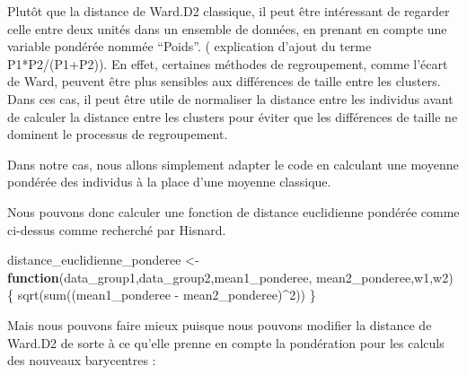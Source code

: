 \documentclass[
]{article}
\newenvironment{Shaded}{\begin{snugshade}}{\end{snugshade}}
\newcommand{\ControlFlowTok}[1]{\textcolor[rgb]{0.13,0.29,0.53}{\textbf{#1}}}
\newcommand{\DecValTok}[1]{\textcolor[rgb]{0.00,0.00,0.81}{#1}}
\newcommand{\FunctionTok}[1]{\textcolor[rgb]{0.00,0.00,0.00}{#1}}
\newcommand{\NormalTok}[1]{#1}
\newcommand{\OtherTok}[1]{\textcolor[rgb]{0.56,0.35,0.01}{#1}}
\newcommand{\SpecialCharTok}[1]{\textcolor[rgb]{0.00,0.00,0.00}{#1}}
\begin{document}
Plutôt que la distance de Ward.D2 classique, il peut être intéressant de
regarder celle entre deux unités dans un ensemble de données, en prenant
en compte une variable pondérée nommée ``Poids''. ( explication d'ajout
du terme P1*P2/(P1+P2)). En effet, certaines méthodes de regroupement,
comme l'écart de Ward, peuvent être plus sensibles aux différences de
taille entre les clusters. Dans ces cas, il peut être utile de
normaliser la distance entre les individus avant de calculer la distance
entre les clusters pour éviter que les différences de taille ne dominent
le processus de regroupement.

Dans notre cas, nous allons simplement adapter le code en calculant une
moyenne pondérée des individus à la place d'une moyenne classique.

Nous pouvons donc calculer une fonction de distance euclidienne pondérée
comme ci-dessus comme recherché par Hisnard.

\begin{Shaded}
\begin{Highlighting}[]
\NormalTok{distance\_euclidienne\_ponderee }\OtherTok{\textless{}{-}} \ControlFlowTok{function}\NormalTok{(data\_group1,data\_group2,mean1\_ponderee, mean2\_ponderee,w1,w2) \{}
  \FunctionTok{sqrt}\NormalTok{(}\FunctionTok{sum}\NormalTok{((mean1\_ponderee }\SpecialCharTok{{-}}\NormalTok{ mean2\_ponderee)}\SpecialCharTok{\^{}}\DecValTok{2}\NormalTok{))}
\NormalTok{\}}
\end{Highlighting}
\end{Shaded}

Mais nous pouvons faire mieux puisque nous pouvons modifier la distance
de Ward.D2 de sorte à ce qu'elle prenne en compte la pondération pour
les calculs des nouveaux barycentres :
\end{document}
